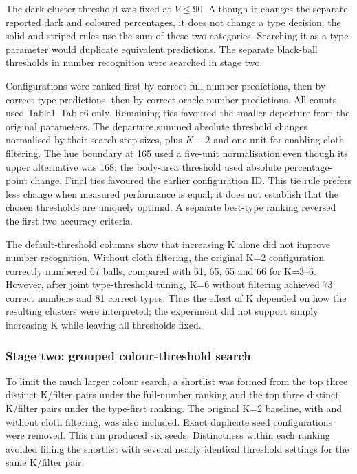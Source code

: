 The dark-cluster threshold was fixed at $V\leq90$. Although it changes the
separate reported dark and coloured percentages, it does not change a type
decision: the solid and striped rules use the sum of these two categories.
Searching it as a type parameter would duplicate equivalent predictions.
The separate black-ball thresholds in number recognition were searched in
stage two.

Configurations were ranked first by correct full-number predictions, then by
correct type predictions, then by correct oracle-number predictions. All
counts used Table1--Table6 only. Remaining ties favoured the smaller departure
from the original parameters. The departure summed absolute threshold changes
normalised by their search step sizes, plus $K-2$ and one unit for enabling
cloth filtering. The hue boundary at 165 used a five-unit normalisation even
though its upper alternative was 168; the body-area threshold used absolute
percentage-point change. Final ties favoured the earlier configuration ID.
This tie rule prefers less change when measured performance is equal; it
does not establish that the chosen thresholds are uniquely optimal. A
separate best-type ranking reversed the first two accuracy criteria.



The default-threshold columns show that increasing K alone did not improve
number recognition. Without cloth filtering, the original K=2 configuration
correctly numbered 67 balls, compared with 61, 65, 65 and 66 for K=3--6.
However, after joint type-threshold tuning, K=6 without filtering achieved
73 correct numbers and 81 correct types. Thus the effect of K depended on
how the resulting clusters were interpreted; the experiment did not support
simply increasing K while leaving all thresholds fixed.

\subsubsection{Stage two: grouped colour-threshold search}

To limit the much larger colour search, a shortlist was formed from the
top three distinct K/filter pairs under the full-number ranking and the
top three distinct K/filter pairs under the type-first ranking. The original
K=2 baseline, with and without cloth filtering, was also included. Exact
duplicate seed configurations were removed. This run produced six seeds.
Distinctness within each ranking avoided filling the shortlist with several
nearly identical threshold settings for the same K/filter pair.


